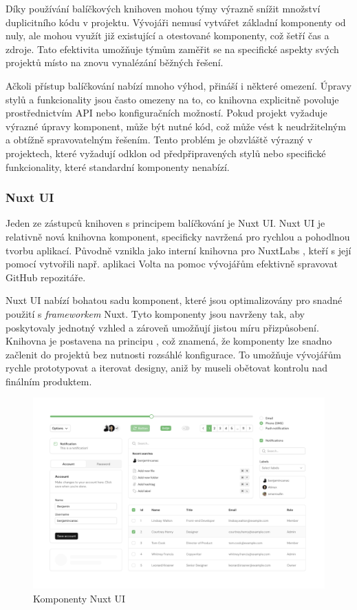 Díky používání balíčkových knihoven mohou týmy výrazně snížit množství duplicitního kódu v projektu. Vývojáři nemusí vytvářet základní komponenty od nuly, ale mohou využít již existující a otestované komponenty, což šetří čas a zdroje. Tato efektivita umožňuje týmům zaměřit se na specifické aspekty svých projektů místo na znovu vynalézání běžných řešení.

Ačkoli přístup balíčkování nabízí mnoho výhod, přináší i některé omezení. Úpravy stylů a funkcionality jsou často omezeny na to, co knihovna explicitně povoluje prostřednictvím API nebo konfiguračních možností. Pokud projekt vyžaduje výrazné úpravy komponent, může být nutné  kód, což může vést k neudržitelným a obtížně spravovatelným řešením. Tento problém je obzvláště výrazný v projektech, které vyžadují odklon od předpřipravených stylů nebo specifické funkcionality, které standardní komponenty nenabízí.

\subsubsection{Nuxt UI}
Jeden ze zástupců knihoven s principem balíčkování je Nuxt UI. Nuxt UI je relativně nová knihovna komponent, specificky navržená pro rychlou a pohodlnou tvorbu aplikací. Původně vznikla jako interní knihovna pro NuxtLabs \cite{NuxtLabs}, kteří s její pomocí vytvořili např. aplikaci Volta na pomoc vývojářům efektivně spravovat GitHub repozitáře. \cite{Volta}

Nuxt UI nabízí bohatou sadu komponent, které jsou optimalizovány pro snadné použití s \emph{frameworkem} Nuxt. Tyto komponenty jsou navrženy tak, aby poskytovaly jednotný vzhled a zároveň umožňují jistou míru přizpůsobení. Knihovna je postavena na principu , což znamená, že komponenty lze snadno začlenit do projektů bez nutnosti rozsáhlé konfigurace. To umožňuje vývojářům rychle prototypovat a iterovat designy, aniž by museli obětovat kontrolu nad finálním produktem.

\begin{figure}[H]
    \includegraphics[width=\textwidth]{images/nuxt-ui}
    \caption{Komponenty Nuxt UI} \label{picture:nuxt-ui}
\end{figure}

